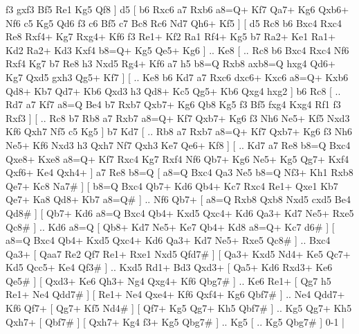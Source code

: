 f3  gxf3 Bf5  Re1 Kg5  Qf8   ]  d5 [  b6 Rxc6  a7 Rxb6  a8=Q+ Kf7  Qa7+ Kg6  Qxb6+ Nf6  c5 Kg5  Qd6 f3  c6 Bf5  c7 Bc8  Rc6 Nd7  Qh6+ Kf5   ]  [  d5 Rc8  b6 Bxc4  Rxc4 Re8  Rxf4+ Kg7  Rxg4+ Kf6  f3 Re1+  Kf2 Ra1  Rf4+ Kg5  b7 Ra2+  Ke1 Ra1+  Kd2 Ra2+  Kd3 Kxf4  b8=Q+ Kg5  Qe5+ Kg6   ] .. Ke8 [ .. Rc8  b6 Bxc4  Rxc4 Nf6  Rxf4 Kg7  b7 Re8  h3 Nxd5  Rg4+ Kf6  a7 h5  b8=Q Rxb8  axb8=Q hxg4  Qd6+ Kg7  Qxd5 gxh3  Qg5+ Kf7   ]  [ .. Ke8  b6 Kd7  a7 Rxc6  dxc6+ Kxc6  a8=Q+ Kxb6  Qd8+ Kb7  Qd7+ Kb6  Qxd3 h3  Qd8+ Kc5  Qg5+ Kb6  Qxg4 hxg2   ]  b6   Rc8 [ .. Rd7  a7 Kf7  a8=Q Be4  b7 Rxb7  Qxb7+ Kg6  Qb8 Kg5  f3 Bf5  fxg4 Kxg4  Rf1 f3  Rxf3   ]  [ .. Rc8  b7 Rb8  a7 Rxb7  a8=Q+ Kf7  Qxb7+ Kg6  f3 Nh6  Ne5+ Kf5  Nxd3 Kf6  Qxh7 Nf5  c5 Kg5   ]  b7   Kd7 [ .. Rb8  a7 Rxb7  a8=Q+ Kf7  Qxb7+ Kg6  f3 Nh6  Ne5+ Kf6  Nxd3 h3  Qxh7 Nf7  Qxh3 Ke7  Qe6+ Kf8   ]  [ .. Kd7  a7 Re8  b8=Q Bxc4  Qxe8+ Kxe8  a8=Q+ Kf7  Rxc4 Kg7  Rxf4 Nf6  Qb7+ Kg6  Ne5+ Kg5  Qg7+ Kxf4  Qxf6+ Ke4  Qxh4+   ]  a7   Re8    b8=Q [  a8=Q Bxc4  Qa3 Ne5  b8=Q Nf3+  Kh1 Rxb8  Qe7+ Kc8  Na7#   ]  [  b8=Q Bxc4  Qb7+ Kd6  Qb4+ Kc7  Rxc4 Re1+  Qxe1 Kb7  Qe7+ Ka8  Qd8+ Kb7  a8=Q#   ] .. Nf6    Qb7+ [  a8=Q Rxb8  Qxb8 Nxd5  cxd5 Be4  Qd8#   ]  [  Qb7+ Kd6  a8=Q Bxc4  Qb4+ Kxd5  Qxc4+ Kd6  Qa3+ Kd7  Ne5+ Rxe5  Qc8#   ] .. Kd6   a8=Q [  Qb8+ Kd7  Ne5+ Ke7  Qb4+ Kd8  a8=Q+ Kc7  d6#   ]  [  a8=Q Bxc4  Qb4+ Kxd5  Qxc4+ Kd6  Qa3+ Kd7  Ne5+ Rxe5  Qc8#   ] .. Bxc4    Qa3+ [  Qaa7 Re2  Qf7 Re1+  Rxe1 Nxd5  Qfd7#   ]  [  Qa3+ Kxd5  Nd4+ Ke5  Qc7+ Kd5  Qcc5+ Ke4  Qf3#   ] .. Kxd5   Rd1+   Bd3    Qxd3+ [  Qa5+ Kd6  Rxd3+ Ke6  Qe5#   ]  [  Qxd3+ Ke6  Qh3+ Ng4  Qxg4+ Kf6  Qbg7#   ] .. Ke6    Re1+ [  Qg7 h5  Re1+ Ne4  Qdd7#   ]  [  Re1+ Ne4  Qxe4+ Kf6  Qxf4+ Kg6  Qbf7#   ] .. Ne4   Qdd7+   Kf6   Qf7+ [  Qg7+ Kf5  Nd4#   ]  [  Qf7+ Kg5  Qg7+ Kh5  Qbf7#   ] .. Kg5   Qg7+   Kh5    Qxh7+ [  Qbf7#   ]  [  Qxh7+ Kg4  f3+ Kg5  Qbg7#   ] .. Kg5    [ .. Kg5  Qbg7#   ] 0-1  |

